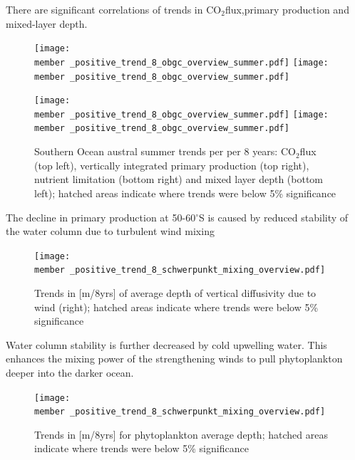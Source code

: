 \documentclass[aspectratio=169]{beamer}
\newcommand{\member}{m182_1988_1995} %
\begin{document}
\begin{frame}{There are significant correlations of trends in CO$_2$flux,primary production and mixed-layer depth.}
	
	\begin{figure}
		\centering
		\texttt{[image: \\member \_positive\_trend\_8\_obgc\_overview\_summer.pdf]} %
\texttt{[image: \\member \_positive\_trend\_8\_obgc\_overview\_summer.pdf]} %

\texttt{[image: \\member \_positive\_trend\_8\_obgc\_overview\_summer.pdf]} %
\texttt{[image: \\member \_positive\_trend\_8\_obgc\_overview\_summer.pdf]} %
\caption{Southern Ocean austral summer trends per per 8 years: CO$_2$flux (top left), vertically integrated primary production (top right), nutrient limitation (bottom right) and mixed layer depth (bottom left); hatched areas indicate where trends were below 5\% significance}
\label{fig:co2flux_intpp}
	\end{figure}
\end{frame}	

\begin{frame}{The decline in primary production at 50-60$^\circ$S is caused by reduced stability of the water column due to turbulent wind mixing\citep{Sverdrup1953}}

	\begin{figure}
		\centering
		\texttt{[image: \\member \_positive\_trend\_8\_schwerpunkt\_mixing\_overview.pdf]}
\caption{Trends in [m/8yrs] of average depth of vertical diffusivity due to wind (right); hatched areas indicate where trends were below 5\% significance}
\label{fig:wind_mixing}
	\end{figure}
	
\end{frame}

\begin{frame}{Water column stability is further decreased by cold upwelling water. This enhances the mixing power of the strengthening winds to pull phytoplankton deeper into the darker ocean.}
	\begin{figure}
		\centering
		\texttt{[image: \\member \_positive\_trend\_8\_schwerpunkt\_mixing\_overview.pdf]}
		\caption{Trends in [m/8yrs] for phytoplankton average depth; hatched areas indicate where trends were below 5\% significance}
	\label{fig:wind_mixing}	
	\end{figure}

\end{frame}
\end{document}
